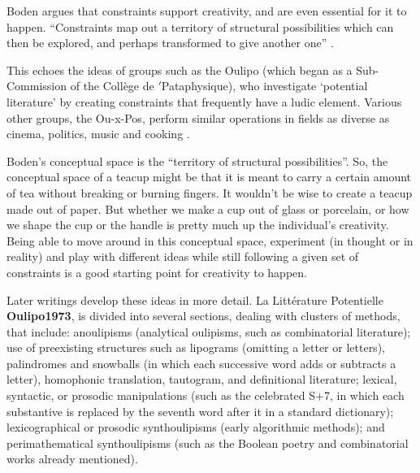 \begin{leftbar}
Boden argues that constraints support creativity, and are even essential for it to happen. ``Constraints map out a territory of structural possibilities which can then be explored, and perhaps transformed to give another one'' \autocite[p.82]{Boden2003}.
\end{leftbar}

\begin{leftbar}
This echoes the ideas of groups such as the Oulipo (which began as a Sub-Commission of the Collège de $'$Pataphysique), who investigate `potential literature' by creating constraints that frequently have a ludic element. Various other groups, the Ou-x-Pos, perform similar operations in fields as diverse as cinema, politics, music and cooking \autocite{Motte2007}.
\end{leftbar}

\begin{leftbar}
Boden's conceptual space is the ``territory of structural possibilities''. So, the conceptual space of a teacup might be that it is meant to carry a certain amount of tea without breaking or burning fingers. It wouldn't be wise to create a teacup made out of paper. But whether we make a cup out of glass or porcelain, or how we shape the cup or the handle is pretty much up the individual's creativity. Being able to move around in this conceptual space, experiment (in thought or in reality) and play with different ideas while still following a given set of constraints is a good starting point for creativity to happen.
\end{leftbar}

%
\begin{leftbar}
Later writings develop these ideas in more detail. La Littérature Potentielle \textbf{Oulipo1973}, is divided into several sections, dealing with clusters of methods, that include: anoulipisms (analytical oulipisms, such as combinatorial literature); use of preexisting structures such as lipograms (omitting a letter or letters), palindromes and snowballs (in which each successive word adds or subtracts a letter), homophonic translation, tautogram, and definitional literature; lexical, syntactic, or prosodic manipulations (such as the celebrated S+7, in which each substantive is replaced by the seventh word after it in a standard dictionary); lexicographical or prosodic synthoulipisms (early algorithmic methods); and perimathematical synthoulipisms (such as the Boolean poetry and combinatorial works already mentioned).
\end{leftbar}

